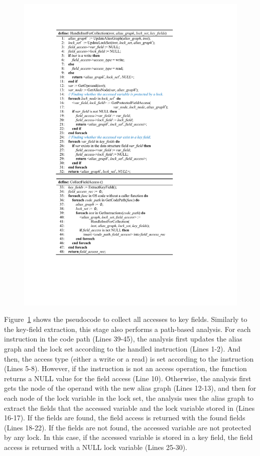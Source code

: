 \begin{figure}[htbp]
	\centering
	\includegraphics[width=1\linewidth]{figures/fig_pseudocode_access_collect.pdf}
	\label{fig_pseudocode_access_collect}
\end{figure}

Figure~\ref{fig_pseudocode_access_collect} shows the pseudocode to collect all 
accesses to key fields. Similarly to the key-field extraction, this stage also 
performs a path-based analysis. For each instruction in the code path (Lines 
39-45), the analysis first updates the alias graph and the lock set according 
to the handled instruction (Lines 1-2). And then, the access type (either a 
write or a read) is set according to the instruction (Lines 5-8). However, if 
the instruction is not an access operation, the function returns a NULL value 
for the field access (Line 10). Otherwise, the analysis first gets the node of 
the operand with the new alias graph (Lines 12-13), and then for each node of 
the lock variable in the lock set, the analysis uses the alias graph to extract 
the fields that the accessed variable and the lock variable stored in (Lines 
16-17). If the fields are found, the field access is returned with the found 
fields (Lines 18-22). If the fields are not found, the accessed variable  are 
not protected by any lock. In this case, if the accessed variable is stored in 
a key field, the field access is returned with a NULL lock variable (Lines 
25-30).

